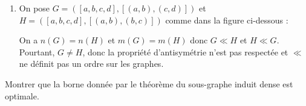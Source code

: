 \documentclass[11pt,a4paper]{article}
\theoremstyle{break}
\begin{document}
\begin{td-sol}
\begin{enumerate}
\begin{enumerate}[label=(\alph*)]
            \item \textbf{Transitivité :} soient \(G, H\) et \(I\) trois graphes tels que \(G\) est sous-graphe de \(H\) et \(H\) est sous-graphe de \(I\).
            \begin{equation*}
                \begin{aligned}
                    V(G) \subseteq V(H) \quad\text{et}\quad V(H) \subseteq V(I) &\implies V(G) \subseteq V(I) \\
                    E(G) \subseteq E(H) \quad\text{et}\quad E(H) \subseteq E(I) &\implies E(G) \subseteq E(I)
                \end{aligned}
            \end{equation*}
            Ainsi, comme \(V(G) \subseteq V(I)\) et \(E(G) \subseteq E(I)\), on a bien \(G\) sous-graphe de \(I\).
        \end{enumerate}

        \item On pose \(G = ([a, b, c, d], [(a, b), (c, d)])\) et \(H = ([a, b, c, d], [(a, b), (b, c)])\) comme dans la figure ci-dessous :
        
        \vspace{0.5em}
        \begin{center}
            
        \end{center}
        \vspace{0.5em}

        On a \(n(G) = n(H)\) et \(m(G) = m(H)\) donc \(G \ll H\) et \(H \ll G\).
        Pourtant, \(G \neq H\), donc la propriété d'antisymétrie n'est pas respectée et \(\ll\) ne définit pas un ordre sur les graphes.
    \end{enumerate}
\end{td-sol}

\begin{td-exo}
    Montrer que la borne donnée par le théorème du sous-graphe induit dense est optimale.
\end{td-exo}
\end{document}
